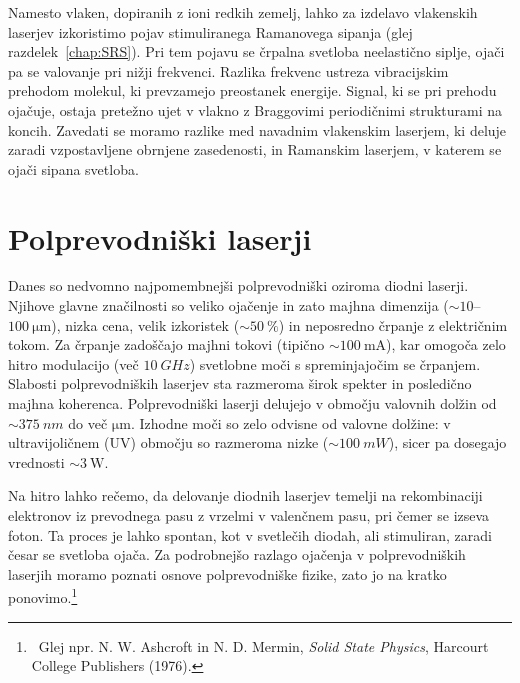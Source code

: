 \begin{remark}
 Namesto vlaken, dopiranih z ioni redkih zemelj, lahko za izdelavo vlakenskih laserjev
 izkoristimo pojav stimuliranega Ramanovega sipanja (glej razdelek~\ref{chap:SRS}). 
 Pri tem pojavu se črpalna svetloba neelastično siplje, ojači pa se valovanje 
 pri nižji frekvenci. Razlika frekvenc ustreza vibracijskim prehodom 
 molekul, ki prevzamejo preostanek energije. Signal, ki se pri prehodu ojačuje, 
 ostaja pretežno ujet v vlakno z Braggovimi periodičnimi strukturami na koncih.
 Zavedati se moramo razlike med navadnim vlakenskim laserjem, ki deluje zaradi vzpostavljene
 obrnjene zasedenosti, in Ramanskim laserjem, v katerem se ojači sipana
 svetloba.
\end{remark}

\section{Polprevodniški laserji}
\label{chap:SCL}
Danes so nedvomno najpomembnejši polprevodniški oziroma diodni 
laserji.
Njihove glavne značilnosti so veliko ojačenje in zato majhna 
dimenzija ($\sim 10$--$100~\si{\micro\metre}$), nizka cena, 
velik izkoristek ($\sim 50~\%$) in neposredno črpanje z električnim tokom. 
Za črpanje zadoščajo majhni tokovi 
(tipično $\sim 100~\si{\milli\ampere}$), kar omogoča zelo hitro modulacijo (več $10~\si{GHz}$)
svetlobne moči s spreminjajočim se črpanjem. Slabosti polprevodniških laserjev sta razmeroma širok 
spekter in posledično majhna koherenca. Polprevodniški laserji delujejo v območju 
valovnih dolžin od $\sim 375~\si{nm}$ do več $\si{\micro\meter}$. Izhodne moči
so zelo odvisne od valovne dolžine: v ultravijoličnem (UV) območju so razmeroma nizke ($\sim 100~\si{mW}$),
sicer pa dosegajo vrednosti $\sim 3~\si{\watt}$.

Na hitro lahko rečemo, da delovanje diodnih laserjev temelji na rekombinaciji  
elektronov iz prevodnega pasu z vrzelmi v valenčnem pasu, pri čemer se izseva foton. Ta proces je lahko 
spontan, kot v svetlečih diodah, ali stimuliran, zaradi česar se svetloba ojača. 
Za podrobnejšo razlago ojačenja v polprevodniških 
laserjih moramo poznati osnove polprevodniške fizike, zato jo na kratko 
ponovimo.\footnote{~Glej npr. N. W. Ashcroft in N. D. Mermin, {\it Solid State Physics}, Harcourt College
Publishers (1976).}

